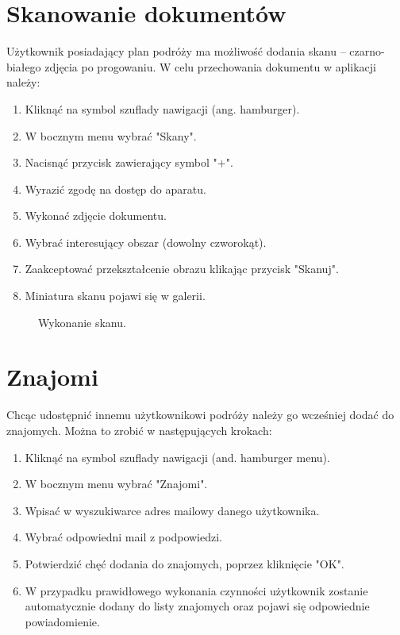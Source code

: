 \section{Skanowanie dokumentów}
Użytkownik posiadający plan podróży ma możliwość dodania skanu – czarno-białego zdjęcia po progowaniu.
W celu przechowania dokumentu w aplikacji należy:
\begin{enumerate}
\item Kliknąć na symbol szuflady nawigacji (ang. hamburger).
\item W bocznym menu wybrać "Skany".
\item Nacisnąć przycisk zawierający symbol "+".
\item Wyrazić zgodę na dostęp do aparatu.
\item Wykonać zdjęcie dokumentu.
\item Wybrać interesujący obszar (dowolny czworokąt).
\item Zaakceptować przekształcenie obrazu klikając przycisk "Skanuj".
\item Miniatura skanu pojawi się w galerii.
\end{enumerate}


\begin{figure}[h]

\centering
\null\hfill
{}
\hfill
{}
\hfill\null

\null\hfill
{}
\hfill
{}
\hfill\null

\caption{Wykonanie skanu.}
\label{fig:podrecznik8}
\end{figure}
\FloatBarrier

\section{Znajomi}
Chcąc udostępnić innemu użytkownikowi podróży należy go wcześniej dodać do znajomych. Można to zrobić w następujących krokach:
\begin{enumerate}
\item Kliknąć na symbol szuflady nawigacji (and. hamburger menu).
\item W bocznym menu wybrać "Znajomi".
\item Wpisać w wyszukiwarce adres mailowy danego użytkownika.
\item Wybrać odpowiedni mail z podpowiedzi.
\item Potwierdzić chęć dodania do znajomych, poprzez kliknięcie "OK".
\item W przypadku prawidłowego wykonania czynności użytkownik zostanie automatycznie dodany do listy znajomych oraz pojawi się odpowiednie powiadomienie.
\end{enumerate}

